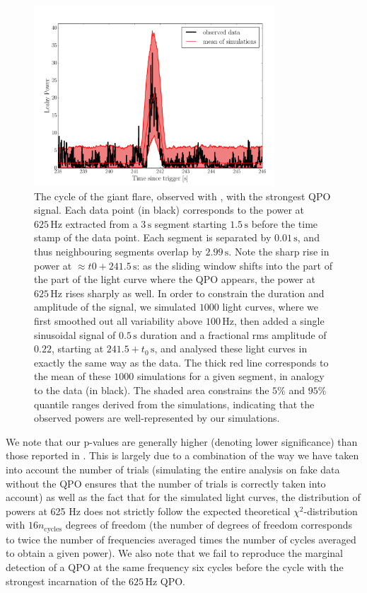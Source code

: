 \documentclass{emulateapj}
\begin{document}
\begin{figure}[htbp]
\begin{center}
\includegraphics[width=9cm]{f6.pdf}
\caption{The cycle of the giant flare, observed with \rxte, with the strongest QPO signal. Each data point (in black) corresponds to the power at $625 \,\mathrm{Hz}$ extracted from a $3\,\mathrm{s}$ segment starting $1.5\,\mathrm{s}$ before the time stamp of the data point. Each segment is separated by $0.01\,\mathrm{s}$, and thus neighbouring segments overlap by $2.99 \,\mathrm{s}$. Note the sharp rise in power at $\approx t0+ 241.5\,\mathrm{s}$: as the sliding window shifts into the part of the part of the light curve where the QPO appears, the power at $625\,\mathrm{Hz}$ rises sharply as well. In order to constrain the duration and amplitude of the signal, we simulated $1000$ light curves, where we first smoothed out all variability above $100\,\mathrm{Hz}$, then added a single sinusoidal signal of $0.5\,\mathrm{s}$ duration and a fractional rms amplitude of $0.22$, starting at $241.5 +t_0\,\mathrm{s}$, and analysed these light curves in exactly the same way as the data. The thick red line corresponds to the mean of these $1000$ simulations for a given segment, in analogy to the data (in black). The shaded area constrains the $5\%$ and $95\%$ quantile ranges derived from the simulations, indicating that the observed powers are well-represented by our simulations.}
\label{fig:rxte_sims}
\end{center}
\end{figure}

We note that our p-values are generally higher (denoting lower significance) than those reported in \citet{Strohmayer06}. This is largely due to a combination of the way we have taken into account the number of trials (simulating the entire analysis on fake data without the QPO ensures that the number of trials is correctly taken into account) as well as the fact that for the simulated light curves, the distribution of powers at 625 Hz does not strictly follow the expected theoretical $\chi^2$-distribution with $16n_{\mathrm{cycles}}$ degrees of freedom (the number of degrees of freedom corresponds to twice the number of frequencies averaged times the number of cycles averaged to obtain a given power).
We also note that we fail to reproduce the marginal detection of a QPO at the same frequency six cycles before the cycle with the strongest incarnation of the $625\, \mathrm{Hz}$ QPO. 
\end{document}
